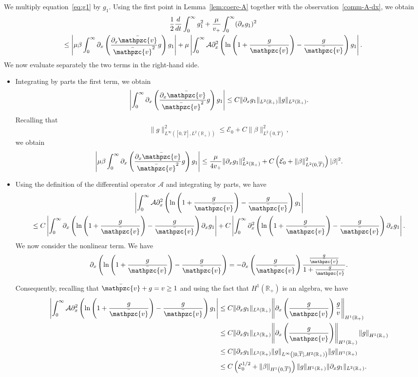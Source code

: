 \documentclass[AHL,Unicode,longabstracts,published]{cedram}
\newcommand{\R}{\mathbb{R}}
\newcommand{\p}{\partial}
\newcommand{\bv}{\bar{\mathpzc{v}}}
\newcommand{\cA}{\mathcal A}
\newcommand{\cE}{\mathcal E}
\begin{document}
We multiply equation~\eqref{eq:g1} by $g_1$. Using the first point in Lemma~\ref{lem:coerc-A} together with the observation~\eqref{comm-A-dx}, we obtain
\begin{multline}\label{eq:energ-g1-0}
\frac{1}{2}\frac{d}{dt}\int_0^\infty g_1^2 + \frac{\mu}{v_+}\int_0^\infty (\p_x g_1)^2\\
\leq \left| \mu \beta \int_0^\infty\p_x \left(\frac{\p_x \bv}{\bv^2} g\right) g_1\right|
+ \mu \left| \int_0^\infty\cA \p_x^2 \left(\ln\left(1+ \frac{g}{\bv}\right) - \frac{g}{\bv}\right) g_1\right|.
\end{multline}
We now evaluate separately the two terms in the right-hand side.
\begin{itemize}
\item Integrating by parts the first term, we obtain
\[
\left| \int_0^\infty\p_x \left(\frac{\p_x \bv}{\bv^2} g\right) g_1\right|\leq C \|\p_x g_1\|_{L^2(\R_+)}\|g\|_{L^2(\R_+)}.
\]
Recalling that
\[
\|g\|_{L^\infty([0,\overline{T}], L^2(\R_+))}^2\leq \cE_0 + C\|\beta\|_{L^2\left(0, \overline{T}\right)}^2,
\]
we obtain
\[
\left| \mu \beta \int_0^\infty\p_x \left(\frac{\p_x \bv}{\bv^2} g\right) g_1\right|\leq \frac{\mu}{4v_+}\|\p_x g_1\|_{L^2(\R_+)}^2 + C\left(\cE_0 + \|\beta\|_{L^2(0, \overline{T})}^2\right)|\beta|^2.
\]

\item Using the definition of the differential operator $\cA$ and integrating by parts, we have
\begin{multline*}
\left| \int_0^\infty\cA \p_x^2 \left(\ln\left(1+ \frac{g}{\bv}\right) - \frac{g}{\bv}\right) g_1\right|\\
\leq C \left| \int_0^\infty \p_x \left(\ln\left(1+ \frac{g}{\bv}\right) - \frac{g}{\bv}\right) \p_x g_1\right|+ C \left| \int_0^\infty \p_x^2 \left(\ln\left(1+ \frac{g}{\bv}\right) - \frac{g}{\bv}\right) \p_x g_1\right|.
\end{multline*}
We now consider the nonlinear term. We have
\begin{equation} \label{diff-quadratic}
\p_x \left(\ln\left(1+ \frac{g}{\bv}\right) - \frac{g}{\bv}\right)= -\p_x \left(\frac{g}{\bv}\right) \frac{\frac{g}{\bv}}{1+ \frac{g}{\bv}}.
\end{equation}


Consequently, recalling that $\bv + g= v\geq 1$ {and using the fact that $H^1(\R_+)$ is an algebra,} we have
\begin{align*}
\left| \int_0^\infty\cA \p_x^2 \left(\ln\left(1+ \frac{g}{\bv}\right) - \frac{g}{\bv}\right) g_1\right|
&\leq C \|\p_x g_1\|_{L^2(\R_+)} {
\left\| \p_x \left(\frac{g}{\bv}\right) \frac{g}{v}\right\|_{H^1(\R_+)}}\\
&\leq C \|\p_x g_1\|_{L^2(\R_+)}{
\left\| \p_x \left(\frac{g}{\bv}\right) \right\|_{H^1(\R_+)} \left\|g\right\|_{H^1(\R_+)}} \\
&\leq C \|\p_x g_1\|_{L^2(\R_+)} \| g\|_{L^\infty\left([0, \overline{T}], H^2(\R_+)\right)}\| g\|_{H^1(\R_+)} \\
&\leq C \left(\cE_0^{1/2} + \|\beta\|_{H^1\left(0, \overline{T}\right)}\right)\| g\|_{H^1(\R_+)} \|\p_x g_1\|_{L^2(\R_+)}.
\end{align*}


\end{itemize}
\end{document}
